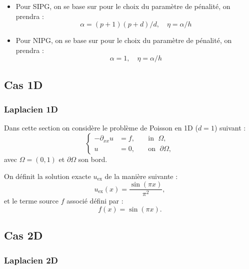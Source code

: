 \documentclass[12pt,a4paper]{article}
\begin{document}
\begin{itemize}
    \item Pour SIPG, on se base sur \cite{Shahbazi2005} pour le choix du paramètre de pénalité, on prendra :
    $$\alpha = (p+1)(p+d)/d, \quad \eta = \alpha/h$$
    \item Pour NIPG, on se base sur \cite{Riviere1999} pour le choix du paramètre de pénalité, on prendra :
    $$\alpha = 1, \quad \eta = \alpha/h$$
\end{itemize}


\subsection{Cas 1D}

\subsubsection{Laplacien 1D}\label{sec:lap1d}

Dans cette section on considère le problème de Poisson en 1D ($d=1$) suivant :
\begin{equation*}
    \left\{
    \begin{aligned}
        -\partial_{xx} u & = f, \; &  & \text{in } \; \Omega,         \\
        u                & = 0, \; &  & \text{on } \; \partial\Omega,
    \end{aligned}
    \right.
\end{equation*}
avec $\Omega=(0,1)$ et $\partial\Omega$ son bord.

On définit la solution exacte $u_\text{ex}$ de la manière suivante :
\begin{equation*}
    u_{\text{ex}}(x) = \frac{\sin(\pi x)}{\pi^2},
\end{equation*}
et le terme source $f$ associé défini par :
\begin{equation*}
    f(x) = \sin(\pi x).
\end{equation*}

\subsection{Cas 2D}

\subsubsection{Laplacien 2D}\label{sec:lap2d}
\end{document}

